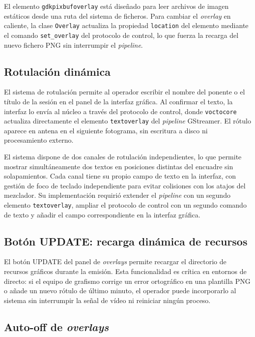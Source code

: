 El elemento \texttt{gdkpixbufoverlay} está diseñado para leer archivos de imagen
estáticos desde una ruta del sistema de ficheros. Para cambiar el \textit{overlay} en caliente,
la clase \texttt{Overlay} actualiza la propiedad \texttt{location} del elemento mediante
el comando \texttt{set\_overlay} del protocolo de control, lo que fuerza la recarga del
nuevo fichero PNG sin interrumpir el \textit{pipeline}.

\subsection{Rotulación dinámica}
\label{sec:doble_rotulacion}

El sistema de rotulación permite al operador escribir el nombre del ponente o el título
de la sesión en el panel de la interfaz gráfica. Al confirmar el texto, la interfaz lo
envía al núcleo a través del protocolo de control, donde \texttt{voctocore} actualiza
directamente el elemento \texttt{textoverlay} del \textit{pipeline} GStreamer. El rótulo aparece
en antena en el siguiente fotograma, sin escritura a disco ni procesamiento externo.

El sistema dispone de dos canales de rotulación independientes, lo que permite mostrar
simultáneamente dos textos en posiciones distintas del encuadre sin solapamientos. Cada
canal tiene su propio campo de texto en la interfaz, con gestión de foco de teclado
independiente para evitar colisiones con los atajos del mezclador. Su implementación
requirió extender el \textit{pipeline} con un segundo elemento \texttt{textoverlay}, ampliar el
protocolo de control con un segundo comando de texto y añadir el campo correspondiente
en la interfaz gráfica.

\subsection{Botón UPDATE: recarga dinámica de recursos}

El botón UPDATE del panel de \textit{overlays} permite recargar el directorio de
recursos gráficos durante la emisión. Esta funcionalidad es crítica en entornos de
directo: si el equipo de grafismo corrige un error ortográfico en una plantilla PNG o
añade un nuevo rótulo de último minuto, el operador puede incorporarlo al sistema sin
interrumpir la señal de vídeo ni reiniciar ningún proceso.

\subsection{Auto-off de \textit{overlays}}

